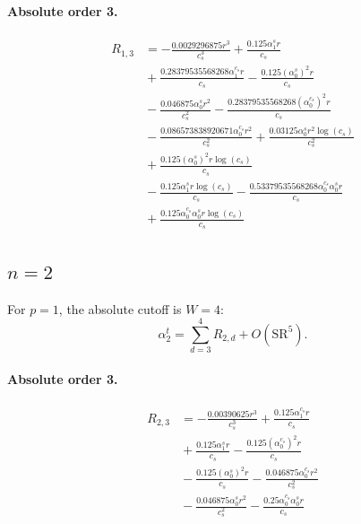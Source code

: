 \documentclass[10pt]{article}
\begin{document}
\paragraph{Absolute order 3.}
\begin{align*}
R_{1,3} &=  - \frac{0.0029296875 r^{3}}{c_{s}^{3}} + \frac{0.125 \alpha_{1}^s r}{c_{s}} \\
&{}  + \frac{0.28379535568268 \alpha_{1}^{c_s} r}{c_{s}} - \frac{0.125 \left(\alpha_{0}^s\right)^{2} r}{c_{s}} \\
&{}  - \frac{0.046875 \alpha_{0}^s r^{2}}{c_{s}^{2}} - \frac{0.28379535568268 \left(\alpha_{0}^{c_s}\right)^{2} r}{c_{s}} \\
&{}  - \frac{0.086573838920671 \alpha_{0}^{c_s} r^{2}}{c_{s}^{2}} + \frac{0.03125 \alpha_{0}^s r^{2} \log{\left(c_{s} \right)}}{c_{s}^{2}} \\
&{}  + \frac{0.125 \left(\alpha_{0}^s\right)^{2} r \log{\left(c_{s} \right)}}{c_{s}} \\
&{}  - \frac{0.125 \alpha_{1}^s r \log{\left(c_{s} \right)}}{c_{s}} - \frac{0.53379535568268 \alpha_{0}^{c_s} \alpha_{0}^s r}{c_{s}} \\
&{}  + \frac{0.125 \alpha_{0}^{c_s} \alpha_{0}^s r \log{\left(c_{s} \right)}}{c_{s}}
\end{align*}

\subsection{$n=2$}
For $p=1$, the absolute cutoff is $W=4$:
\[\alpha_{2}^t=\sum_{d=3}^{4}R_{2,d}+O(\mathrm{SR}^{5}).\]
\paragraph{Absolute order 3.}
\begin{align*}
R_{2,3} &=  - \frac{0.00390625 r^{3}}{c_{s}^{3}} + \frac{0.125 \alpha_{1}^{c_s} r}{c_{s}} \\
&{}  + \frac{0.125 \alpha_{1}^s r}{c_{s}} - \frac{0.125 \left(\alpha_{0}^{c_s}\right)^{2} r}{c_{s}} \\
&{}  - \frac{0.125 \left(\alpha_{0}^s\right)^{2} r}{c_{s}} - \frac{0.046875 \alpha_{0}^{c_s} r^{2}}{c_{s}^{2}} \\
&{}  - \frac{0.046875 \alpha_{0}^s r^{2}}{c_{s}^{2}} - \frac{0.25 \alpha_{0}^{c_s} \alpha_{0}^s r}{c_{s}}
\end{align*}
\end{document}
